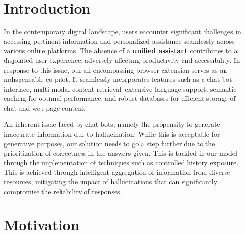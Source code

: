 \documentclass[sigconf,natbib=true,anonymous=false]{acmart}
\begin{document}




\maketitle

\section{Introduction}
In the contemporary digital landscape, users encounter significant challenges in accessing pertinent information and personalized assistance seamlessly across various online platforms. The absence of a \textbf{unified assistant} contributes to a disjointed user experience, adversely affecting productivity and accessibility. In response to this issue, our all-encompassing browser extension serves as an indispensable co-pilot. It seamlessly incorporates features such as a chat-bot interface, multi-modal content retrieval, extensive language support, semantic caching for optimal performance, and robust databases for efficient storage of chat and web-page content.

An inherent issue faced by chat-bots, namely the propensity to generate inaccurate information due to hallucination. While this is acceptable for generative purposes, our solution needs to go a step further due to the prioritization of correctness in the answers given. This is tackled in our model through the implementation of techniques such as controlled history exposure. This is achieved through intelligent aggregation of information from diverse resources, mitigating the impact of hallucinations that can significantly compromise the reliability of responses.


\section{Motivation}
\end{document}
